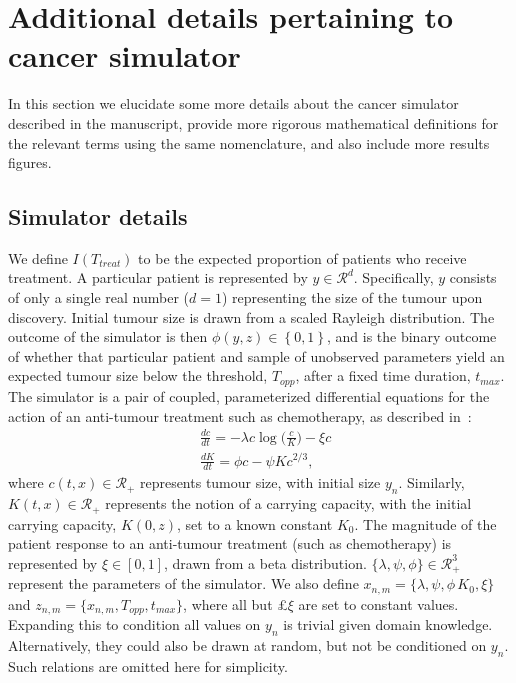

\section{Additional details pertaining to cancer simulator}
\label{sec:cancer_sim_app}

In this section we elucidate some more details about the cancer simulator described in the manuscript, provide more rigorous mathematical definitions for the relevant terms using the same nomenclature, and also include more results figures.

\subsection{Simulator details}
\label{sec:cancer_sim_details}

We define $I(T_{treat})$ to be the expected proportion of patients who receive treatment.
A particular patient is represented by $y\in\mathcal{R}^d$. Specifically, $y$ consists of only a single real number ($d=1$) representing the size of the tumour upon discovery. Initial tumour size is drawn from a scaled Rayleigh distribution.
The outcome of the simulator is then $\phi(y,z)\in\left\lbrace 0,1\right\rbrace $, and is the binary outcome of whether that particular patient and sample of unobserved parameters yield an expected tumour size below the threshold, $T_{opp}$, after a fixed time duration, $t_{max}$. The simulator is a pair of coupled, parameterized differential equations for the action of an anti-tumour treatment such as chemotherapy, as described in~\citet{enderling2014cancer}:
\begin{align}
&\frac{dc}{dt} = -\lambda c \log\big(\frac{c}{K}\big) - \xi c \\
&\frac{dK}{dt} = \phi c - \psi K c^{2/3},
\end{align}
where $c(t,x)\in\mathcal{R}_+$ represents tumour size, with initial size $y_n$.
Similarly, $K(t,x)\in\mathcal{R}_+$ represents the notion of a carrying capacity, with the initial carrying capacity, $K(0,z)$, set to a known constant $K_0$.
The magnitude of the patient response to an anti-tumour treatment (such as chemotherapy) is represented by $\xi\in[0,1]$, drawn from a beta distribution.
$\{\lambda, \psi, \phi\}\in\mathcal{R}_+^3$ represent the parameters of the simulator.
We also define $x _{n,m}= \{\lambda, \psi, \phi\, K_0, \xi\}$ and $z_{n,m}=\{x_{n,m}, T_{opp}, t_{max}\}$, where all but £$\xi$ are set to constant values. Expanding this to condition all values on $y_n$ is trivial given domain knowledge. Alternatively, they could also be drawn at random, but not be conditioned on $y_n$. Such relations are omitted here for simplicity.

